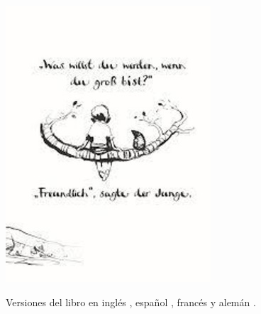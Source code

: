 \documentclass[spanish]{textolivre}
\begin{document}
\begin{figure}[htbp]
\begin{minipage}[t]{0.32\textwidth}
\includegraphics[width=\linewidth]{Fig7.png}
 \label{fig7}
\end{minipage}

\caption{Versiones del libro en inglés \cite{mackesy_boy_2020a}, español \cite{mackesy_nino_2020}, francés \cite{mackesy_enfant_2020c} y alemán \cite{mackesy_junge_2020d}.}
\label{fig:4a7}
\end{figure}


\end{document}
